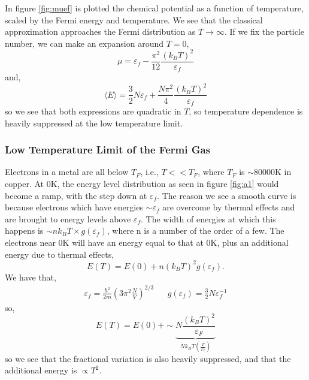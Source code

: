 \documentclass{book}
\begin{document}
In figure \ref{fig:muef} is plotted the chemical potential as a function of temperature, scaled by the Fermi energy and temperature. We see that the classical approximation approaches the Fermi distribution as $T \to \infty$. If we fix the particle number, we can make an expansion around $T = 0$,
\begin{equation}
	\mu = \varepsilon_f - \frac{\pi^2}{12}\frac{(k_BT)^2}{\varepsilon_f}
\end{equation}
and,
\begin{equation}
	\langle E \rangle = \frac{3}{2}N\varepsilon_f + \frac{N\pi^2}{4}\frac{(k_BT)^2}{\varepsilon_f}
\end{equation}
so we see that both expressions are quadratic in $T$, so temperature dependence is heavily suppressed at the low temperature limit.
\subsubsection{Low Temperature Limit of the Fermi Gas}
Electrons in a metal are all below $T_F$, i.e., $T << T_F$, where $T_F$ is $\sim 80000$K in copper. At 0K, the energy level distribution as seen in figure \ref{fig:a1} would become a ramp, with the step down at $\varepsilon_f$. The reason we see a smooth curve is because electrons which have energies $\sim\varepsilon_f$ are overcome by thermal effects and are brought to energy levels above $\varepsilon_f$. The width of energies at which this happens is $\sim nk_BT\times g(\varepsilon_f)$, where n is a number of the order of a few. The electrons near 0K will have an energy equal to that at $0$K, plus an additional energy due to thermal effects,
\begin{equation}
	E(T) = E(0) + n(k_BT)^2g(\varepsilon_f).
\end{equation}
We have that,
\begin{align}
	\varepsilon_f = \frac{\hbar^2}{2m}\left(3\pi^2\frac{N}{V}\right)^{2/3} && g(\varepsilon_f) = \frac{3}{2}N\varepsilon_f^{-1}
\end{align}
so,
\begin{equation}
	E(T) = E(0) + \sim \underbrace{N\frac{(k_BT)^2}{\varepsilon_F}}_{Nk_BT\left(\frac{T}{T_F}\right)}
\end{equation}
so we see that the fractional variation is also heavily suppressed, and that the additional energy is $\propto T^2$. 
\end{document}
